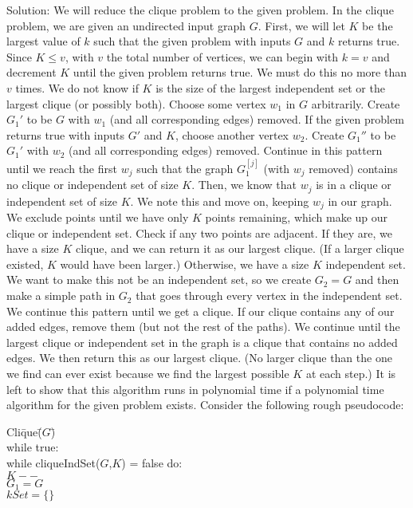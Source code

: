 \documentclass{article}
\begin{document}
\begin{enumerate}
\newline Solution: We will reduce the clique problem to the given problem. In the clique problem, we are given an undirected input graph $G$. First, we will let $K$ be the largest value of $k$ such that the given problem with inputs $G$ and $k$ returns true. Since $K\le v$, with $v$ the total number of vertices, we can begin with $k=v$ and decrement $K$ until the given problem returns true. We must do this no more than $v$ times. We do not know if $K$ is the size of the largest independent set or the largest clique (or possibly both). Choose some vertex $w_1$ in $G$ arbitrarily. Create $G_1'$ to be $G$ with $w_1$ (and all corresponding edges) removed. If the given problem returns true with inputs $G'$ and $K$, choose another vertex $w_2$. Create $G_1''$ to be $G_1'$ with $w_2$ (and all corresponding edges) removed. Continue in this pattern until we reach the first $w_j$ such that the graph $G_1^{[j]}$ (with $w_j$ removed) contains no clique or independent set of size $K$. Then, we know that $w_j$ is in a clique or independent set of size $K$. We note this and move on, keeping $w_j$ in our graph. We exclude points until we have only $K$ points remaining, which make up our clique or independent set. Check if any two points are adjacent. If they are, we have a size $K$ clique, and we can return it as our largest clique. (If a larger clique existed, $K$ would have been larger.) Otherwise, we have a size $K$ independent set. We want to make this not be an independent set, so we create $G_2=G$ and then make a simple path in $G_2$ that goes through every vertex in the independent set. We continue this pattern until we get a clique. If our clique contains any of our added edges, remove them (but not the rest of the paths). We continue until the largest clique or independent set in the graph is a clique that contains no added edges. We then return this as our largest clique. (No larger clique than the one we find can ever exist because we find the largest possible $K$ at each step.) It is left to show that this algorithm runs in polynomial time if a polynomial time algorithm for the given problem exists. Consider the following rough pseudocode:
\begin{tabbing}
Cli\= que\= ($G$\= )\\
\>while true:\\
\>\>while cliqueIndSet($G$,$K$) = false do:\\
\>\>\>$K--$\\
\>\>$G_1=G$\\
\>\>$kSet=\{\}$\\

\end{tabbing}
\end{enumerate}
\end{document}
